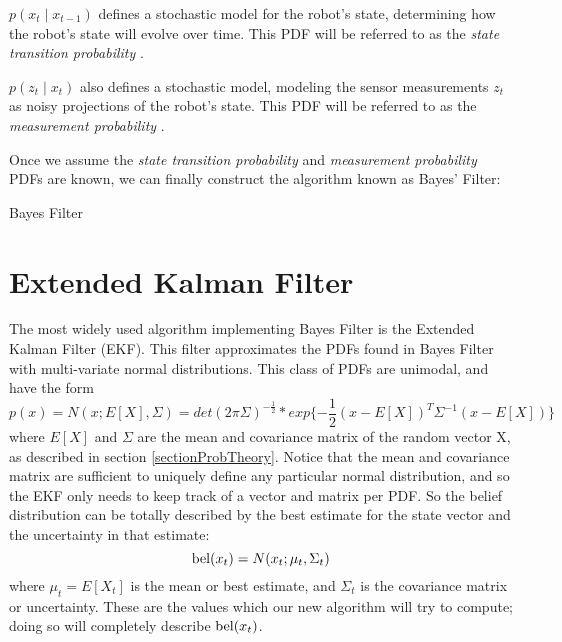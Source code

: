 \(p(x_t \mathbin{\vert} x_{t-1})\) defines a stochastic model for the robot's state, determining how the robot's state will evolve over time. This PDF will be referred to as the \textit{state transition probability}  \cite{probabilisticRobotics}.

\(p(z_t \mathbin{\vert} x_t)\) also defines a stochastic model, modeling the sensor measurements \(z_t\) as noisy projections of the robot's state. This PDF will be referred to as the \textit{measurement probability}  \cite{probabilisticRobotics}.

Once we assume the \textit{state transition probability} and \textit{measurement probability} PDFs are known, we can finally construct the algorithm known as Bayes' Filter:

\begin{algorithm} 
\caption{Bayes Filter} 
\label{alg:BayesFilter}
\begin{algorithmic}[1]
	\State {}
	\EndFunction
\end{algorithmic}
\end{algorithm}

\section{Extended Kalman Filter} \label{sectionEKF}

The most widely used algorithm implementing Bayes Filter is the Extended Kalman Filter (EKF). This filter approximates the PDFs found in Bayes Filter with multi-variate normal distributions. This class of PDFs are unimodal, and have the form 
\begin{equation} \label{eqDefNormal}
p(x) = N(x; E[X],\Sigma) = det(2 \pi \Sigma)^{-\frac{1}{2}} * exp \{-\frac{1}{2} (x - E[X])^T \Sigma^{-1} (x - E[X])\}
\end{equation}
where \(E[X]\) and \(\Sigma\) are the mean and covariance matrix of the random vector X, as described in section \ref{sectionProbTheory}. Notice that the mean and covariance matrix are sufficient to uniquely define any particular normal  distribution, and so the EKF only needs to keep track of a vector and matrix per PDF. So the belief distribution can be totally described by the best estimate for the state vector and the uncertainty in that estimate:
\begin{equation} \label{eqBelNormalDef}
\mathrm{bel}(x_t) = N(x_t; \mu_t,\Sigma_t)
\end{equation}
where \(\mu_t = E[X_t]\) is the mean or best estimate, and \(\Sigma_t\) is the covariance matrix or uncertainty. These are the values which our new algorithm will try to compute; doing so will completely describe \(\mathrm{bel}(x_t)\).

